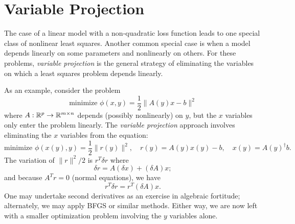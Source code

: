 \documentclass[12pt, leqno]{article} %
\begin{document}
\section*{Variable Projection}


The case of a linear model with a non-quadratic loss function leads to
one special class of nonlinear least squares.  Another common special
case is when a model depends linearly on some parameters and
nonlinearly on others.  For these problems, {\em variable projection}
is the general strategy of eliminating the variables on which a least
squares problem depends linearly.

As an example, consider the problem
\[
  \mbox{minimize } \phi(x,y) = \frac{1}{2} \|A(y) x-b\|^2
\]
where $A : \mathbb{R}^p \rightarrow \mathbb{R}^{m \times n}$ depends (possibly
nonlinearly) on $y$, but the $x$ variables only enter the problem
linearly.  The {\em variable projection} approach involves
eliminating the $x$ variables from the equation:
\[
  \mbox{minimize } \phi(x(y), y) =
  \frac{1}{2} \|r(y)\|^2,
  \quad r(y) = A(y) x(y) - b,
  \quad x(y) = A(y)^\dagger b.
\]
The variation of $\|r\|^2/2$ is $r^T \delta r$ where
\[
  \delta r = A (\delta x) + (\delta A) x;
\]
and because $A^T r = 0$ (normal equations), we have
\[
  r^T \delta r = r^T (\delta A) x.
\]
One may undertake second derivatives as an exercise in algebraic
fortitude; alternately, we may apply BFGS or similar methods.
Either way, we are now left with a smaller optimization problem
involving the $y$ variables alone.
\end{document}
